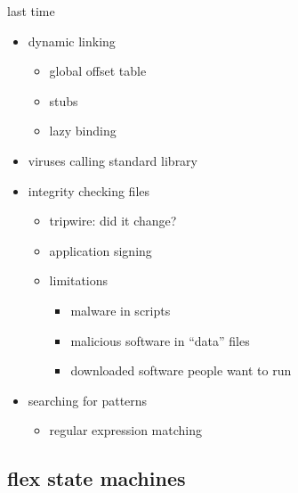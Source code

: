 \graphicspath{{./figures/}}
\title{}
\date{}

\begin{frame}
    \titlepage
\end{frame}

\begin{frame}{last time}
    \begin{itemize}
    \item dynamic linking
        \begin{itemize}
        \item global offset table
        \item stubs
        \item lazy binding
        \end{itemize}
    \item viruses calling standard library
    \item integrity checking files
        \begin{itemize}
        \item tripwire: did it change?
        \item application signing
        \item limitations
            \begin{itemize}
            \item malware in scripts
            \item malicious software in ``data'' files
            \item downloaded software people want to run
            \end{itemize}
        \end{itemize}
    \item searching for patterns
        \begin{itemize}
        \item regular expression matching
        \end{itemize}
    \end{itemize}
\end{frame}

\usetikzlibrary{arrows.meta,calc,fit,matrix,positioning,shapes.callouts}

\subsection{flex state machines}






